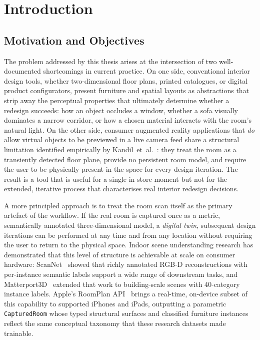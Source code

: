 \chapter{Introduction}
\label{ch:introduction}

\section{Motivation and Objectives}
\label{sec:intro:motivation}

The problem addressed by this thesis arises at the intersection of two
well-documented shortcomings in current practice. On one side, conventional
interior design tools, whether two-dimensional floor plans, printed catalogues,
or digital product configurators, present furniture and spatial layouts as
abstractions that strip away the perceptual properties that ultimately determine
whether a redesign succeeds: how an object occludes a window, whether a sofa
visually dominates a narrow corridor, or how a chosen material interacts with
the room's natural light. On the other side, consumer augmented reality
applications that \emph{do} allow virtual objects to be previewed in a live
camera feed share a structural limitation identified empirically by
Kandil~et~al.~\cite{kandil2021ux}: they treat the room as a transiently
detected floor plane, provide no persistent room model, and require the user
to be physically present in the space for every design iteration. The result
is a tool that is useful for a single in-store moment but not for the extended,
iterative process that characterises real interior redesign decisions.

A more principled approach is to treat the room scan itself as the primary
artefact of the workflow. If the real room is captured once as a metric,
semantically annotated three-dimensional model, a \emph{digital twin}, subsequent
design iterations can be performed at any time and from any location without
requiring the user to return to the physical space. Indoor scene understanding
research has demonstrated that this level of structure is achievable at scale
on consumer hardware: ScanNet~\cite{dai2017scannet} showed that richly annotated
RGB-D reconstructions with per-instance semantic labels support a wide range of
downstream tasks, and Matterport3D~\cite{CAS+17} extended that work to
building-scale scenes with 40-category instance labels. Apple's RoomPlan
API~\cite{apple2024roomplan2} brings a real-time, on-device subset of this
capability to supported iPhones and iPads, outputting a parametric
\texttt{CapturedRoom} whose typed structural surfaces and classified furniture
instances reflect the same conceptual taxonomy that these research datasets
made trainable.

